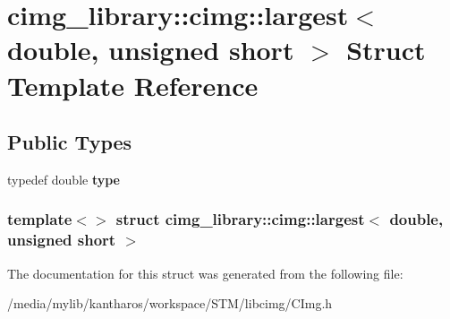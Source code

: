 \hypertarget{structcimg__library_1_1cimg_1_1largest_3_01double_00_01unsigned_01short_01_4}{
\section{cimg\_\-library::cimg::largest$<$ double, unsigned short $>$ Struct Template Reference}
\label{structcimg__library_1_1cimg_1_1largest_3_01double_00_01unsigned_01short_01_4}
}
\subsection*{Public Types}
\begin{DoxyCompactItemize}
\item 
\hypertarget{structcimg__library_1_1cimg_1_1largest_3_01double_00_01unsigned_01short_01_4_a77916d1d03ba7cb7b5380954728dd904}{
typedef double {\bfseries type}}
\label{structcimg__library_1_1cimg_1_1largest_3_01double_00_01unsigned_01short_01_4_a77916d1d03ba7cb7b5380954728dd904}

\end{DoxyCompactItemize}
\subsubsection*{template$<$$>$ struct cimg\_\-library::cimg::largest$<$ double, unsigned short $>$}



The documentation for this struct was generated from the following file:\begin{DoxyCompactItemize}
\item 
/media/mylib/kantharos/workspace/STM/libcimg/CImg.h\end{DoxyCompactItemize}
